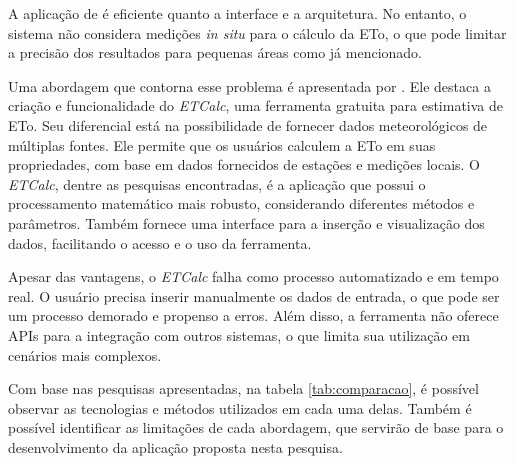 A aplicação de \textcite{Taison_webeva2019} é eficiente quanto a interface e a arquitetura. No entanto, o sistema não considera medições \textit{in situ} para o cálculo da ETo, o que pode limitar a precisão dos resultados para pequenas áreas como já mencionado. 

Uma abordagem que contorna esse problema é apresentada por \textcite{Serban_webeva2022}. Ele destaca a criação e funcionalidade do \textit{ETCalc}, uma ferramenta gratuita para estimativa de ETo. Seu diferencial está na possibilidade de fornecer dados meteorológicos de múltiplas fontes. Ele permite que os usuários calculem a ETo em suas propriedades, com base em dados fornecidos de estações e medições locais. O \textit{ETCalc}, dentre as pesquisas encontradas, é a aplicação que possui o processamento matemático mais robusto, considerando diferentes métodos e parâmetros. Também fornece uma interface para a inserção e visualização dos dados, facilitando o acesso e o uso da ferramenta.

Apesar das vantagens, o \textit{ETCalc} falha como processo automatizado e em tempo real. O usuário precisa inserir manualmente os dados de entrada, o que pode ser um processo demorado e propenso a erros. Além disso, a ferramenta não oferece APIs para a integração com outros sistemas, o que limita sua utilização em cenários mais complexos.

Com base nas pesquisas apresentadas, na tabela \ref{tab:comparacao}, é possível observar as tecnologias e métodos utilizados em cada uma delas. Também é possível identificar as limitações de cada abordagem, que servirão de base para o desenvolvimento da aplicação proposta nesta pesquisa.

